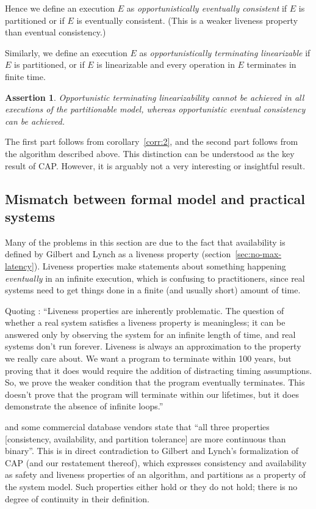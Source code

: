 \documentclass[fleqn,12pt,lineno]{wlpeerj} %
\newtheorem{theorem}{Assertion}
\begin{document}
Hence we define an execution $E$ as \emph{opportunistically eventually consistent} if $E$ is
partitioned or if $E$ is eventually consistent. (This is a weaker liveness property than eventual
consistency.)

Similarly, we define an execution $E$ as \emph{opportunistically terminating linearizable} if $E$ is
partitioned, or if $E$ is linearizable and every operation in $E$ terminates in finite time.

\begin{theorem}\label{th:4}
Opportunistic terminating linearizability cannot be achieved in all executions of the partitionable
model, whereas opportunistic eventual consistency \emph{can} be achieved.
\end{theorem}

The first part follows from corollary~\ref{corr:2}, and the second part follows from the algorithm
described above. This distinction can be understood as the key result of CAP. However, it is
arguably not a very interesting or insightful result.

\subsection{Mismatch between formal model and practical systems}

Many of the problems in this section are due to the fact that availability is defined by Gilbert and
Lynch as a liveness property (section~\ref{sec:no-max-latency}). Liveness properties make statements
about something happening \emph{eventually} in an infinite execution, which is confusing to
practitioners, since real systems need to get things done in a finite (and usually short) amount of
time.

Quoting \citet{Lamport2000bi}: ``Liveness properties are inherently problematic. The question
of whether a real system satisfies a liveness property is meaningless; it can be answered only by
observing the system for an infinite length of time, and real systems don't run forever. Liveness is
always an approximation to the property we really care about. We want a program to terminate within
100 years, but proving that it does would require the addition of distracting timing assumptions.
So, we prove the weaker condition that the program eventually terminates. This doesn't prove that
the program will terminate within our lifetimes, but it does demonstrate the absence of infinite
loops.''

\citet{Brewer2012ba} and some commercial database vendors state that
``all three properties [consistency, availability, and partition tolerance] are more continuous than
binary''. This is in direct contradiction to Gilbert and Lynch's formalization of CAP (and our
restatement thereof), which expresses consistency and availability as safety and liveness properties
of an algorithm, and partitions as a property of the system model. Such properties either hold or
they do not hold; there is no degree of continuity in their definition.
\end{document}
